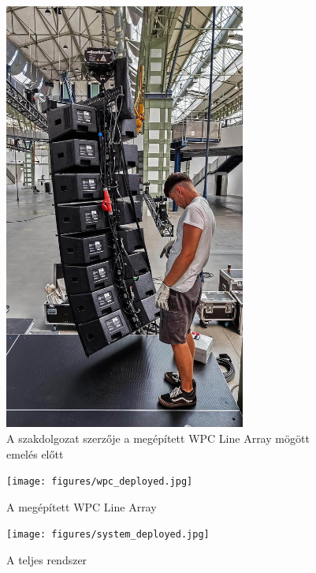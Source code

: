 \begin {figure}[H]
    \centering
    \includegraphics[width=300px]{figures/danci_wpc.jpg}
    \caption{A szakdolgozat szerzője a megépített WPC Line Array mögött emelés előtt}
\end {figure}
\begin {figure}[H]
    \centering
	\texttt{[image: figures/wpc\_deployed.jpg]}
	\caption{A megépített WPC Line Array}
\end {figure}
\begin {figure}[H]
	\centering
	\texttt{[image: figures/system\_deployed.jpg]}
	\caption{A teljes rendszer}
\end {figure}
